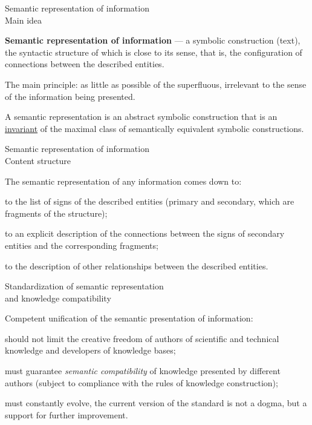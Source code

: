 \begin{frame}{Semantic representation of information\\Main idea}
	\topline
	\justifying
	
	\textbf{Semantic representation of information} ---
	a symbolic construction (text), the syntactic structure of which is close to its sense, that is, the configuration of connections between the described entities.
	
	\medskip
	The main principle: as little as possible of the superfluous, irrelevant to the sense of the information being presented.
	
	\medskip
	A semantic representation is an abstract symbolic construction that is an \uline{invariant} of the maximal class of semantically equivalent symbolic constructions.
	
\end{frame}


\begin{frame}{Semantic representation of information\\Content structure}
	\topline
	\justifying
	
	The semantic representation of any information comes down to:
	\begin{textitemize}
		\item to the list of signs of the described entities (primary and secondary, which are fragments of the structure);
		\item to an explicit description of the connections between the signs of secondary entities and the corresponding fragments;
		\item to the description of other relationships between the described entities.
	\end{textitemize}
	
\end{frame}


\begin{frame}{Standardization of semantic representation\\and knowledge compatibility}
	\topline
	\justifying
	
	Competent unification of the semantic presentation of information:
	\begin{textitemize}
		\item should not limit the creative freedom of authors of scientific and technical knowledge and developers of knowledge bases;
		\item must guarantee \textit{semantic compatibility} of knowledge presented by different authors (subject to compliance with the rules of knowledge construction);
		\item must constantly evolve, the current version of the standard is not a dogma, but a support for further improvement.
	\end{textitemize}
	
\end{frame}


